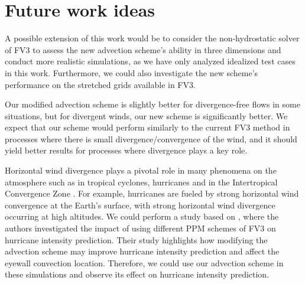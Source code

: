 \section{Future work ideas}
A possible extension of this work would be to consider the non-hydrostatic solver of FV3 to assess the new advection scheme's ability 
in three dimensions and conduct more realistic simulations, as we have only analyzed idealized test cases in this work.
Furthermore, we could also investigate the new scheme's performance on the stretched grids available in FV3.

Our modified advection scheme is slightly better for divergence-free flows in some situations, but for divergent winds, our new scheme is significantly better. 
We expect that our scheme would perform similarly to the current FV3 method in processes where there is small divergence/convergence of the wind, 
and it should yield better results for processes where divergence plays a key role.

Horizontal wind divergence plays a pivotal role in many phenomena on the atmosphere such as in tropical cyclones, hurricanes and in the Intertropical Convergence Zone \citep{holton:2012}.
For example, hurricanes are fueled by strong horizontal wind convergence at the Earth's surface, with strong horizontal wind divergence occurring at high altitudes.
We could perform a study based on \citet{gao:2021}, where the authors investigated the impact of using different PPM schemes of FV3 on hurricane intensity prediction.
Their study highlights how modifying the advection scheme may improve hurricane intensity prediction and affect the eyewall convection location.
Therefore, we could use our advection scheme in these simulations and observe its effect on hurricane intensity prediction.
